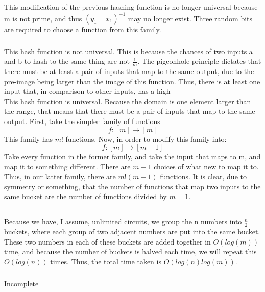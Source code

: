 \documentclass{article}
\begin{document}
\subsubsection{}
This modification of the previous hashing function is no longer universal because m is not prime, and thus $(y_1-x_1)^{-1}$ may no longer exist. Three random bits are required to choose a function from this family.  
\subsubsection{}
This hash function is not universal. This is because the chances of two inputs a and b to hash to the same thing are not $\frac{1}{m}$. The pigeonhole principle dictates that there must be at least a pair of inputs that map to the same output, due to the pre-image being larger than the image of this function. Thus, there is at least one input that, in comparison to other inputs, has a high
\\
This hash function is universal. Because the domain is one element larger than the range, that means that there must be a pair of inputs that map to the same output. First, take the simpler family of functions 
$$f: [m] \rightarrow [m]$$
This family has $m!$ functions. Now, in order to modify this family into:
$$f: [m] \rightarrow [m-1]$$
Take every function in the former family, and take the input that maps to m, and map it to something different. There are $m-1$ choices of what new to map it to. Thus, in our latter family, there are $m!(m-1)$ functions. It is clear, due to symmetry or something, that the number of functions that map two inputs to the same bucket are the number of functions divided by $m=1$.
\subsection{}
\subsubsection{}
Because we have, I assume, unlimited circuits, we group the n numbers into $\frac{n}{2}$ buckets, where each group of two adjacent numbers are put into the same bucket. These two numbers in each of these buckets are added together in $O(log(m))$ time, and because the number of buckets is halved each time, we will repeat this $O(log(n))$ times. Thus, the total time taken is $O(log(n)log(m))$.
\subsubsection{} Incomplete
\end{document}
